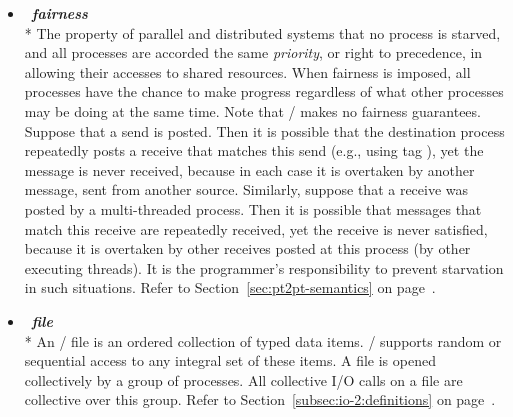 \begin{itemize}
\label{glossary:fairness}
\item  ~\hypertarget{glossary:fairness}{\emph{\textbf{fairness}}} \\*
The property of parallel and distributed systems that no process is starved, 
and all processes are accorded the same \emph{priority}, or right to precedence,
in allowing their accesses 
to shared resources. When fairness is imposed, all processes have the 
chance to make progress regardless of what other processes may be 
doing at the same time. Note that \MPI/  makes no fairness guarantees.
Suppose that a send is posted.  Then it is possible
that the destination process repeatedly posts a receive that matches this
send (e.g., using tag ), yet the message is never received, because in each case it is overtaken by
another message, sent from another source.  Similarly, suppose that a
receive was posted by a multi-threaded process.  Then it is possible that
messages that
match this receive are repeatedly received, yet the receive is never satisfied,
because it is overtaken by other receives posted at this process (by
other executing threads).  It is the programmer's responsibility to prevent
starvation in such situations.
Refer to Section~\ref{sec:pt2pt-semantics} on page~\pageref{sec:pt2pt-semantics}.

\label{glossary:file}
\item  ~\hypertarget{glossary:file}{\emph{\textbf{file}}} \\*
An \MPI/ file is an ordered collection of typed data items.
\MPI/ supports random or sequential access to any integral set of these items.
A file is opened collectively by a group of processes.
All collective I/O calls on a file are collective over this group.
Refer to Section~\ref{subsec:io-2:definitions} on page~\pageref{subsec:io-2:definitions}.


\end{itemize}
